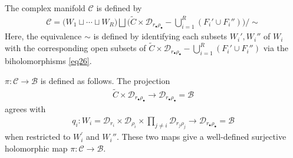 \documentclass[11pt,b5paper,notitlepage]{article}
\theoremstyle{definition}
\theoremstyle{plain}
\newcommand{\wtd}{\widetilde}
\newcommand{\blt}{\bullet}
\newcommand{\<}{\left\langle}
\renewcommand{\>}{\right\rangle}
\newcommand{\MC}{\mathcal{C}}
\newcommand{\MB}{\mathcal{B}}
\newcommand{\MD}{\mathcal{D}}
\numberwithin{equation}{section}
\begin{document}
The complex manifold $\MC$ is defined by 
\begin{gather}
\MC=\big(W_1\sqcup\cdots\sqcup W_R\big)\bigsqcup \big(\wtd C\times \MD_{r_\blt \rho_\blt}-\bigcup_{i=1}^R( F_i'\cup F_i'')\big)\Big/\sim
\end{gather}
Here, the equivalence $\sim$ is defined by identifying each subsets $W_i',W_i''$ of $W_i$ with the corresponding open subsets of $\wtd C\times \MD_{r_\blt \rho_\blt}-\bigcup_{i=1}^R( F_i'\cup F_i'')$ via the biholomorphisms \eqref{eq26}.

$\pi:\MC\rightarrow \MB$ is defined as follows. The projection
\begin{align*}
    \wtd C\times \MD_{r_\blt \rho_\blt}\rightarrow \MD_{r_\blt \rho_\blt}=\MB
\end{align*}
agrees with
\begin{align*}
q_i:W_i=\MD_{r_i}\times \MD_{\rho_i}\times \prod_{j\ne i} \MD_{r_j\rho_j}\rightarrow \MD_{r_\blt \rho_\blt}=\MB
\end{align*}
when restricted to $W_i^\prime$ and $W_i''$. These two maps give a well-defined surjective holomorphic map $\pi:\MC\rightarrow \MB$.
\begin{comment}
    For each $q_\blt=(q_1,\cdots,q_R)\in \MB$, the fiber $\MC_{q_\blt}$ is obtained by removing 
$$
\begin{aligned}
F_j&=\{y\in V_j:\vert \varpi_j(y)\vert\leq \vert q_j\vert/\rho_j\},\\
F_j^\prime&=\{y\in V_j^\prime:\vert \varpi_j^\prime(y)\vert \leq \vert q_j\vert /r_j\},
\end{aligned}
$$
from $\wtd C$, and gluing the remaining part of $\wtd C$ by identifying $y\in V_j$ with $y^\prime\in V_j^\prime$ if $\varpi_j(y)\varpi_j^\prime(y^\prime)=q_j$.
\end{comment}
\end{document}
